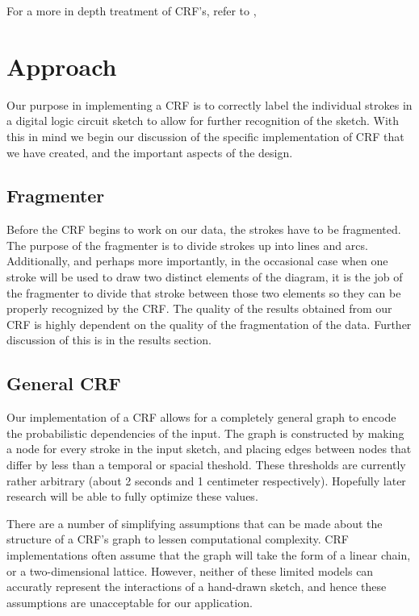 \documentclass[10pt]{acmsiggraph}               %
\begin{document}
For a more in depth treatment of CRF's, refer to \cite{wallach:CRFintro}, \cite{sutton:CRFintro}

\section{Approach}

Our purpose in implementing a CRF is to correctly label the individual strokes in a digital logic circuit sketch
to allow for further recognition of the sketch.  With this in mind we begin our discussion of the specific
implementation of CRF that we have created, and the important aspects of the design.

\subsection{Fragmenter}
Before the CRF begins to work on our data, the strokes have to be fragmented.  The purpose of the fragmenter is to divide strokes up into lines and arcs. Additionally, and perhaps more importantly, in the occasional case when one stroke will be used to draw two distinct elements of the diagram, it is the job of the fragmenter to divide that stroke between those two elements so they can be properly recognized by the CRF. The quality of the results obtained from our CRF is highly dependent on the quality of the fragmentation of the data. Further discussion of this is in the results section. 

\subsection{General CRF}
Our implementation of a CRF allows for a completely general graph to encode the probabilistic dependencies of the input.  The graph is constructed by making a node for every stroke in the input sketch, and placing edges between nodes that differ by less than a temporal or spacial theshold.  These thresholds are currently rather arbitrary (about 2 seconds and 1 centimeter respectively).  Hopefully later research will be able to fully optimize these values.

There are a number of simplifying assumptions that can be made about the structure of a CRF's graph to lessen computational complexity.  CRF implementations often assume that the graph will take the form of a linear chain, or a two-dimensional lattice.  However, neither of these limited models can accuratly represent the interactions of a hand-drawn sketch, and hence these assumptions are unacceptable for our application.
\end{document}

